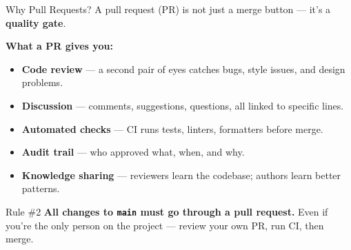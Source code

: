\documentclass[aspectratio=169, 11pt]{beamer}
\begin{document}
\begin{frame}{Why Pull Requests?}
  A pull request (PR) is not just a merge button --- it's a \textbf{quality gate}.

  \vspace{0.5em}
  \textbf{What a PR gives you:}
  \begin{itemize}
    \item \textbf{Code review} --- a second pair of eyes catches bugs, style issues, and design problems.
    \item \textbf{Discussion} --- comments, suggestions, questions, all linked to specific lines.
    \item \textbf{Automated checks} --- CI runs tests, linters, formatters before merge.
    \item \textbf{Audit trail} --- who approved what, when, and why.
    \item \textbf{Knowledge sharing} --- reviewers learn the codebase; authors learn better patterns.
  \end{itemize}

  \vspace{0.5em}
  \begin{alertblock}{Rule \#2}
    \textbf{All changes to \texttt{main} must go through a pull request.}
    Even if you're the only person on the project --- review your own PR, run CI, then merge.
  \end{alertblock}
\end{frame}
\end{document}
